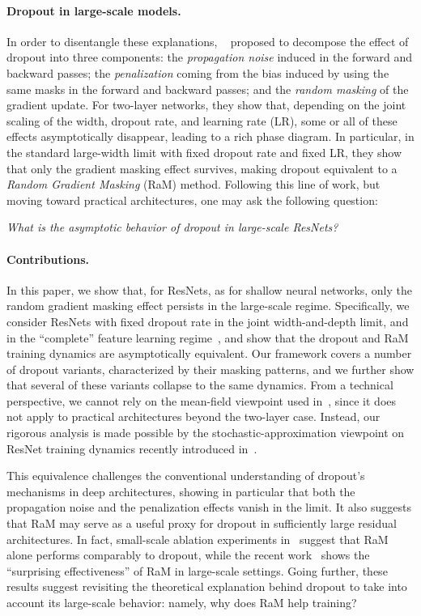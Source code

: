 \documentclass[a4paper,11pt]{article}
\newcommand{\1}{\mathbbm{1}}
\theoremstyle{definition}
\theoremstyle{remark}
\begin{document}
\paragraph{Dropout in large-scale models.}
In order to disentangle these explanations,
~\cite{chizat2025phasediagramdropouttwolayer} proposed to decompose the effect of
dropout into three components: the \emph{propagation noise} induced in the forward and
backward passes; the \emph{penalization} coming from the bias induced by using the same
masks in the forward and backward passes; and the  \emph{random masking} of the
gradient update. For two-layer networks, they show that, depending on the joint scaling
of the width, dropout rate, and learning rate (LR), some or all of these effects
asymptotically disappear, leading to a rich phase diagram. In particular, in the standard
large-width limit with fixed dropout rate and fixed LR, they show that only the gradient
masking effect survives, making dropout equivalent to a \emph{Random Gradient Masking}
(RaM) method. Following this line of work, but moving toward practical architectures,
one may ask the following question:
\begin{center}
    \emph{What is the asymptotic behavior of dropout in large-scale ResNets?}
\end{center}

\paragraph{Contributions.}
In this paper, we show that, for ResNets, as for shallow neural networks, only the random
gradient masking effect persists in the large-scale regime. Specifically, we consider ResNets with
fixed dropout rate in the joint width-and-depth limit, and in the ``complete'' feature
learning regime~\cite{dey2026dontlazycompletepenables}, and show that the dropout and RaM training dynamics are asymptotically equivalent. Our framework covers a number
of dropout variants, characterized by their masking patterns, and we further show that
several of these variants collapse to the same dynamics. From a technical
perspective, we cannot rely on the mean-field viewpoint used
in~\cite{chizat2025phasediagramdropouttwolayer}, since it does not apply to practical
architectures beyond the two-layer case. Instead, our rigorous analysis is made possible
by the stochastic-approximation viewpoint on ResNet training dynamics recently
introduced in~\cite{chizat2025hidden}.

This equivalence challenges the conventional understanding of dropout's mechanisms in
deep architectures, showing in particular that both the propagation noise and the penalization effects vanish in the
limit.
It also suggests that RaM may serve as a useful proxy for dropout in sufficiently large residual architectures. In
fact, small-scale ablation experiments in~\cite{chizat2025phasediagramdropouttwolayer}
suggest that RaM alone performs comparably to dropout, while the recent
work~\cite{joo2026surprisingeffectivenessmaskingupdates} shows the ``surprising
effectiveness'' of RaM in large-scale settings. Going further, these results suggest revisiting
the theoretical explanation behind dropout to take into account its large-scale behavior:
namely, why does RaM help training? 
\end{document}
